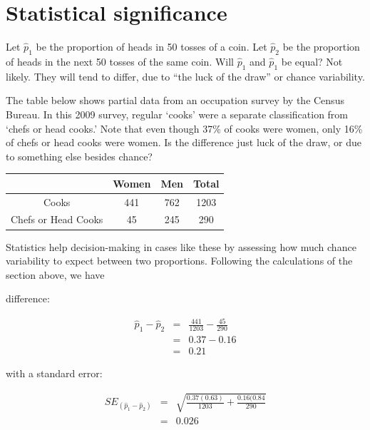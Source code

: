 \documentclass[11pt, chapterprefix=true]{scrbook}\usepackage[]{graphicx}\usepackage[]{color}
\begin{document}
\section{Statistical significance}

Let $\hat{p}_1$ be the proportion of heads in 50 tosses of a coin.  Let $\hat{p}_2$  be the proportion of heads in the next 50 tosses of the same coin.  Will $\hat{p}_1$  and $\hat{p}_1$ be equal?  Not likely.  They will tend to differ, due to ``the luck of the draw'' or chance variability.

The table below shows partial data from an occupation survey by the Census Bureau. In this 2009 survey, regular `cooks' were a separate classification from `chefs or head cooks.'  Note that even though 37\% of cooks were women, only 16\% of chefs or head cooks were women.  Is the difference just luck of the draw, or due to something else besides chance?

\begin{table}[ht]
\centering
\begin{tabular}{@{} cccc @{}} \hline
       & Women & Men & Total \\ \hline
Cooks & 441 & 762 & 1203 \\
Chefs or Head Cooks & 45 & 245 & 290 \\ \hline
\end{tabular}
\end{table}

Statistics help decision-making in cases like these by assessing how much chance variability to expect between two proportions.  Following the calculations of the section above, we have

\vspace{4mm}

\begin{minipage}[ht]{7cm}

difference: 

\begin{eqnarray*}
  \hat{p}_1 - \hat{p}_2 &=& \frac{441}{1203} - \frac{45}{290} \\
    &=& 0.37 - 0.16 \\
    &=& 0.21
\end{eqnarray*}

\end{minipage}
\begin{minipage}[ht]{7cm}

with a standard error:

\begin{eqnarray*}
  SE_{(\hat{p}_1 - \hat{p}_2)} &=& \sqrt{ \frac{0.37(0.63)}{1203} + \frac{0.16(0.84}{290}} \\
  &=& 0.026
\end{eqnarray*}

\end{minipage}
\end{document}
